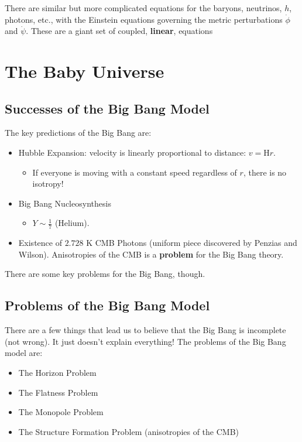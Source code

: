 \documentclass{article}
\begin{document}
There are similar but more complicated equations for the baryons, neutrinos, $h$, photons, etc., with the Einstein equations governing the metric perturbations $\dot{\phi}$ and $\dot{\psi}$. These are a giant set of coupled, \textbf{linear}, equations 

\section{The Baby Universe}

\subsection{Successes of the Big Bang Model}

The key predictions of the Big Bang are:

\begin{itemize}
    \item Hubble Expansion: velocity is linearly proportional to distance: $v = \text{H}r$. 
    \begin{itemize}
        \item If everyone is moving with a constant speed regardless of $r$, there is no isotropy!
    \end{itemize}
    \item Big Bang Nucleosynthesis
    \begin{itemize}
        \item $Y \sim \frac17$ (Helium). 
    \end{itemize}
    \item Existence of $2.728$ K CMB Photons (uniform piece discovered by Penzias and Wilson). Anisotropies of the CMB is a \textbf{problem} for the Big Bang theory.
\end{itemize}

There are some key problems for the Big Bang, though.

\subsection{Problems of the Big Bang Model}

There are a few things that lead us to believe that the Big Bang is incomplete (not wrong). It just doesn't explain everything! The problems of the Big Bang model are:

\begin{itemize}
    \item The Horizon Problem
    \item The Flatness Problem
    \item The Monopole Problem
    \item The Structure Formation Problem (anisotropies of the CMB)
\end{itemize}
\end{document}
